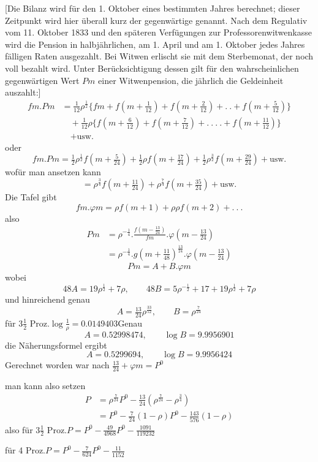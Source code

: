[Die Bilanz wird für den 1. Oktober eines bestimmten Jahres berechnet; dieser Zeitpunkt wird hier überall kurz der gegenwärtige genannt. Nach dem Regulativ vom 11. Oktober 1833 und den späteren Verfügungen zur Professorenwitwenkasse wird die Pension in halbjährlichen, am 1. April und am 1. Oktober jedes Jahres fälligen Raten ausgezahlt. Bei Witwen erlischt sie mit dem Sterbemonat, der noch voll bezahlt wird. Unter Berücksichtigung dessen gilt für den wahrscheinlichen gegenwärtigen Wert \(Pm\) einer Witwenpension, die jährlich die Geldeinheit auszahlt:]
\[
\begin{aligned}
fm\mathord{.}Pm&=\tfrac{1}{12}\rho^{\frac{1}{2}}\{fm+f(m+\tfrac{1}{12})+f(m+\tfrac{2}{12})+.\ .+f(m+\tfrac{5}{12})\}\\
&\quad+\tfrac{1}{12}\rho\{f(m+\tfrac{6}{12})+f(m+\tfrac{7}{12})+.\ .\ .\ .+f(m+\tfrac{11}{12})\}\\
&\quad+\text{usw.}
\end{aligned}
\]
\noindent oder
\[
fm\mathord{.}Pm=\tfrac{1}{2}\rho^{\frac{1}{2}}f(m+\tfrac{5}{24})+\tfrac{1}{2}\rho f(m+\tfrac{17}{24})+\tfrac{1}{2}\rho^{\frac{3}{2}}f(m+\tfrac{29}{24})+\text{usw.}
\]
\noindent wofür man ansetzen kann
\[
=\rho^{\frac{3}{4}}f(m+\tfrac{11}{24})+\rho^{\frac{7}{4}}f(m+\tfrac{35}{24})+\text{usw.}
\]
\noindent Die Tafel gibt
\[
fm\mathord{.}\varphi m=\rho f(m+1)+\rho\rho f(m+2)+.\ .\ .
\]
\noindent also
\[
\begin{aligned}
Pm&=\rho^{-\frac{1}{4}}\mathord{.}\frac{f(m-\tfrac{13}{24})}{fm}\mathord{.}\varphi(m-\tfrac{13}{24})\\
&=\rho^{-\frac{1}{4}}\mathord{.}g(m+\tfrac{11}{48})^{\frac{13}{24}}\mathord{.}\varphi(m-\tfrac{13}{24})
\end{aligned}
\]
\[
Pm=A+B\mathord{.}\varphi m
\]
\noindent wobei
\[
48A=19\rho^{\frac{1}{2}}+7\rho,\qquad48B=5\rho^{-\frac{1}{2}}+17+19\rho^{\frac{1}{2}}+7\rho
\]
\noindent und hinreichend genau
\[
A=\tfrac{13}{24}\rho^{\frac{33}{52}},\qquad B=\rho^{\frac{7}{24}}
\]
\noindent für \(3\tfrac{1}{2}\) Proz.\quad \(\log\tfrac{1}{\rho}=0.0149403\)\quad Genau
\[
A=0.52998474,\qquad\log B=9.9956901
\]
\noindent die Näherungsformel ergibt
\[
A=0.5299694,\qquad\log B=9.9956424
\]
\noindent Gerechnet worden war nach \(\tfrac{13}{24}+\varphi m=P^0\)\par
\noindent man kann also setzen
\[
\begin{aligned}
P&=\rho^{\frac{7}{24}}P^0-\tfrac{13}{24}(\rho^{\frac{7}{24}}-\rho^{\frac{3}{4}})\\
&=P^0-\tfrac{7}{24}(1-\rho)P^0-\tfrac{143}{576}(1-\rho)
\end{aligned}
\]
\noindent also für \(3\tfrac{1}{2}\) Proz.\quad \(P=P^0-\tfrac{49}{4968}P^0-\tfrac{1091}{119232}\)\par
\noindent für 4 Proz.\quad \(P=P^0-\tfrac{7}{624}P^0-\tfrac{11}{1152}\)

